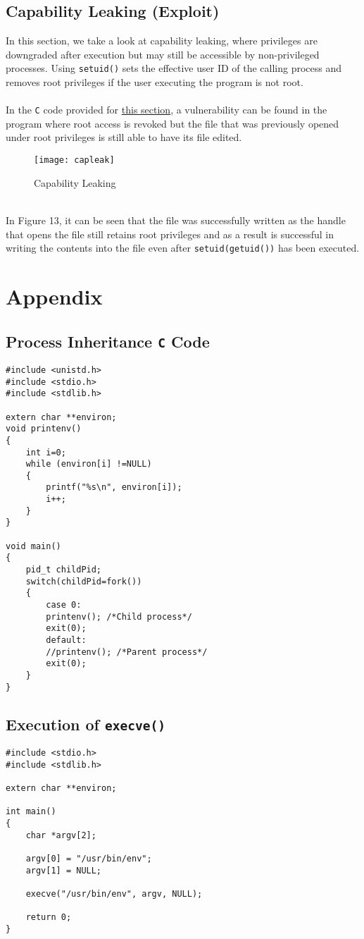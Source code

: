 \documentclass[a4paper,12pt]{article}
\begin{document}
\subsection{Capability Leaking (Exploit)}
In this section, we take a look at capability leaking, where privileges are downgraded after execution but may still be accessible by non-privileged processes. Using \texttt{setuid()} sets the effective user ID of the calling process and removes root privileges if the user executing the program is not root.\\\\In the \texttt{C} code provided for \hyperref[Appsec:3.9]{this section}, a vulnerability can be found in the program where root access is revoked but the file that was previously opened under root privileges is still able to have its file edited. 
\begin{figure}[h]
	\centering
	\texttt{[image: capleak]}
	\caption{Capability Leaking}
	\label{fig:capleak}
\end{figure}
\\In Figure 13, it can be seen that the file was successfully written as the handle that opens the file still retains root privileges and as a result is successful in writing the contents into the file even after \texttt{setuid(getuid())} has been executed.

\newpage
{}
\section{Appendix}
\subsection{Process Inheritance \texttt{C} Code}
\label{Appsec:3.2}

\begin{verbatim}
#include <unistd.h>
#include <stdio.h>
#include <stdlib.h>

extern char **environ;
void printenv()
{
    int i=0;
    while (environ[i] !=NULL)
    {
        printf("%s\n", environ[i]);
        i++;
    }
}

void main()
{
    pid_t childPid;
    switch(childPid=fork())
    {
        case 0:
        printenv(); /*Child process*/
        exit(0);
        default:
        //printenv(); /*Parent process*/
        exit(0);
    }
}
\end{verbatim}
\newpage

\subsection{Execution of \texttt{execve()}}
\label{Appsec:3.3}
\begin{verbatim}
#include <stdio.h>
#include <stdlib.h>

extern char **environ;

int main()
{
    char *argv[2];

    argv[0] = "/usr/bin/env";
    argv[1] = NULL;

    execve("/usr/bin/env", argv, NULL);

    return 0;
}
\end{verbatim}
\end{document}
